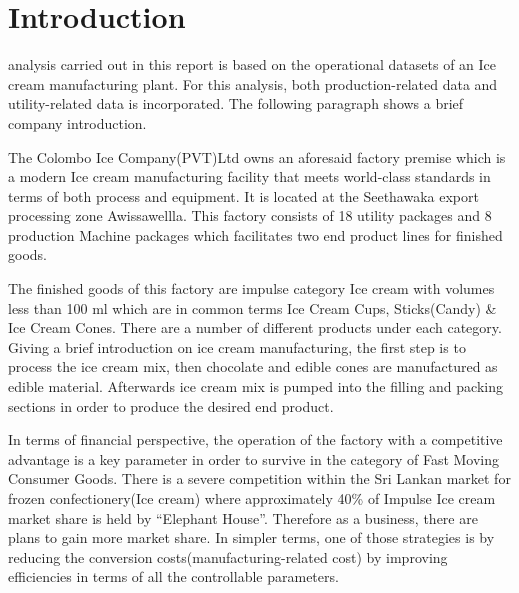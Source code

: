 %
\IEEEpeerreviewmaketitle



\section{Introduction}

 analysis carried out in this report is based on the operational datasets of an Ice cream manufacturing plant. For this analysis, both production-related data and utility-related data is incorporated. The following paragraph shows a brief company introduction.

The Colombo Ice Company(PVT)Ltd owns an aforesaid factory premise which is a modern Ice cream manufacturing facility that meets world-class standards in terms of both process and equipment. It is located at the Seethawaka export processing zone Awissawellla. This factory consists of 18 utility packages and 8 production Machine packages which facilitates two end product lines for finished goods.

The finished goods of this factory are impulse category Ice cream with volumes less than 100 ml which are in common terms Ice Cream Cups, Sticks(Candy) \& Ice Cream Cones.
There are a number of different products under each category. Giving a brief introduction on  ice cream manufacturing, the first step is to process the ice cream mix, then chocolate and edible cones are manufactured as edible material. Afterwards ice cream mix is pumped into the filling and packing sections in order to produce the desired end product.

In terms of financial perspective, the operation of the factory with a competitive advantage is a key parameter in order to survive in the category of Fast Moving Consumer Goods. There is a severe competition within the Sri Lankan market for frozen confectionery(Ice cream) where approximately 40\% of Impulse Ice cream market share is held by “Elephant House”. Therefore as a business, there are plans to gain more market share. In simpler terms, one of those strategies is by reducing the conversion costs(manufacturing-related cost) by improving efficiencies in terms of all the controllable parameters.

